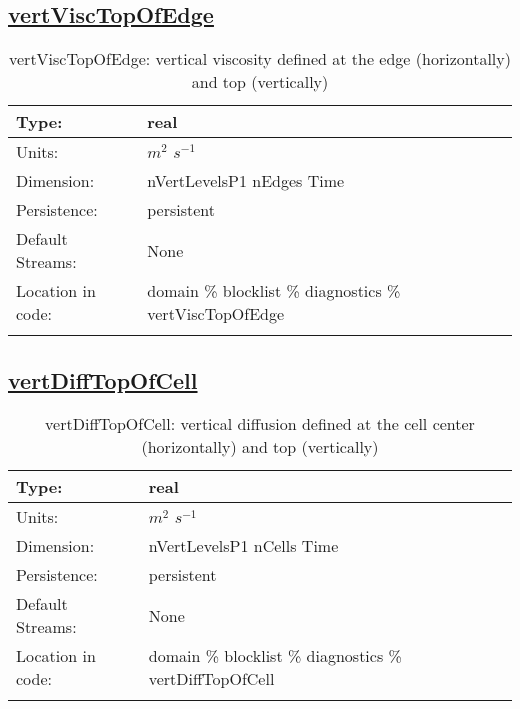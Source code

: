 \subsection[vertViscTopOfEdge]{\hyperref[sec:var_tab_diagnostics]{vertViscTopOfEdge}}
\label{subsec:var_sec_diagnostics_vertViscTopOfEdge}
\begin{center}
\begin{longtable}{| p{2.0in} | p{4.0in} |}
        \hline 
        Type: & real \\
        \hline 
        Units: & $m^2$ $s^{-1}$ \\
        \hline 
        Dimension: & nVertLevelsP1 nEdges Time \\
        \hline 
        Persistence: & persistent \\
        \hline 
		 Default Streams: & None \\
        \hline 
		 Location in code: & domain \% blocklist \% diagnostics \% vertViscTopOfEdge \\
		 \hline 
    \caption{vertViscTopOfEdge: vertical viscosity defined at the edge (horizontally) and top (vertically)}
\end{longtable}
\end{center}
\subsection[vertDiffTopOfCell]{\hyperref[sec:var_tab_diagnostics]{vertDiffTopOfCell}}
\label{subsec:var_sec_diagnostics_vertDiffTopOfCell}
\begin{center}
\begin{longtable}{| p{2.0in} | p{4.0in} |}
        \hline 
        Type: & real \\
        \hline 
        Units: & $m^2$ $s^{-1}$ \\
        \hline 
        Dimension: & nVertLevelsP1 nCells Time \\
        \hline 
        Persistence: & persistent \\
        \hline 
		 Default Streams: & None \\
        \hline 
		 Location in code: & domain \% blocklist \% diagnostics \% vertDiffTopOfCell \\
		 \hline 
    \caption{vertDiffTopOfCell: vertical diffusion defined at the cell center (horizontally) and top (vertically)}
\end{longtable}
\end{center}
